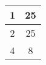 \begin{table}[H]
\begin{tabular}{cc}
\multicolumn{1}{|c|}{1}                                                        & \multicolumn{1}{c|}{25}                                                             \\ \hline
\multicolumn{1}{|c|}{2}                                                        & \multicolumn{1}{c|}{25}                                                             \\ \hline
\multicolumn{1}{|c|}{4}                                                        & \multicolumn{1}{c|}{8}                                                             \\ \hline
\end{tabular}\end{table}
